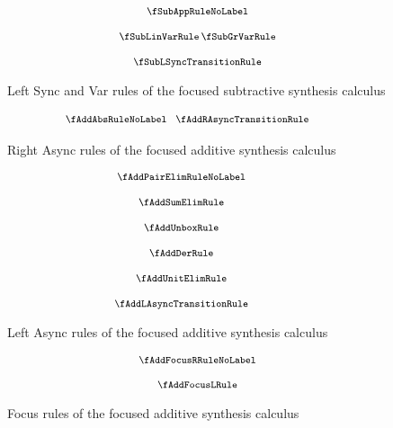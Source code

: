 \begin{figure}[H]
  \begin{align*}
    {\footnotesize{
\begin{array}{c}
  \fSubAppRuleNoLabel
  \\[1.25em]
  \fSubLinVarRule
  \,
  \fSubGrVarRule
  \\[1.25em]
  \fSubLSyncTransitionRule
  \end{array}
    }}
  \end{align*}
  \caption{Left Sync and Var rules of the focused subtractive synthesis calculus}
  \label{fig:focus-sub-left-sync}
\end{figure}

\begin{figure}[H]
  \begin{align*}
    {\footnotesize{
\hspace{-2em}\begin{array}{c}
  \fAddAbsRuleNoLabel
  \;\;\;
  \fAddRAsyncTransitionRule
  \end{array}
    }}
  \end{align*}
  \caption{Right Async rules of the focused additive synthesis calculus}
  \label{fig:focus-add-right-async}
\end{figure}

\begin{figure}[H]
  \begin{align*}
    {\footnotesize{
\hspace{-3em}\begin{array}{c}
  \fAddPairElimRuleNoLabel
  \\[1.25em]
  \fAddSumElimRule
  \\[1.25em]
  \fAddUnboxRule
  \\[1.25em]
  \fAddDerRule
  \\[1.25em]
  \fAddUnitElimRule
  \\[1.25em]
  \fAddLAsyncTransitionRule
  \end{array}
    }}
  \end{align*}
  \caption{Left Async rules of the focused additive synthesis calculus}
  \label{fig:focus-add-left-async}
\end{figure}

\begin{figure}[H]
  \begin{align*}
    {\footnotesize{
\begin{array}{c}
  \fAddFocusRRuleNoLabel
  \\[1.25em]
  \fAddFocusLRule
  \end{array}
    }}
  \end{align*}
  \caption{Focus rules of the focused additive synthesis calculus}
  \label{fig:focus-add-focus}
\end{figure}

